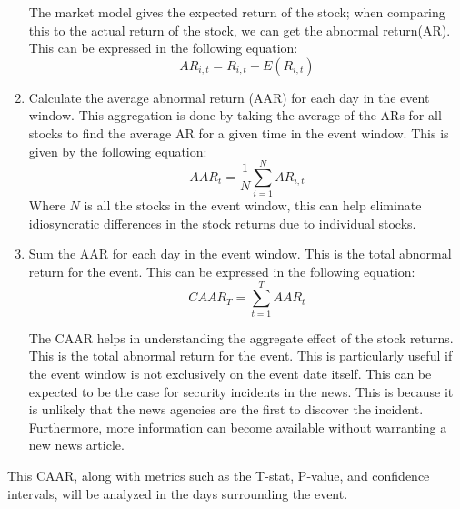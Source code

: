 \begin{enumerate}
    The market model gives the expected return of the stock; when comparing this to the actual return of the stock, we can get the abnormal return(AR). This can be expressed in the following equation:
    $$
A R_{i, t}=R_{i, t}-E\left(R_{i, t}\right)
$$

    \item Calculate the average abnormal return (AAR) for each day in the event window. This aggregation is done by taking the average of the ARs for all stocks to find the average AR for a given time in the event window. This is given by the following equation:
    $$
    A A R_{t}=\frac{1}{N} \sum_{i=1}^{N} A R_{i, t}
    $$
    Where $N$ is all the stocks in the event window, this can help eliminate idiosyncratic differences in the stock returns due to individual stocks.

    \item Sum the AAR for each day in the event window. This is the total abnormal return for the event. This can be expressed in the following equation:
    $$
    C A A R_{T}=\sum_{t=1}^{T} A A R_{t}
    $$

    The CAAR helps in understanding the aggregate effect of the stock returns. This is the total abnormal return for the event. This is particularly useful if the event window is not exclusively on the event date itself. This can be expected to be the case for security incidents in the news. This is because it is unlikely that the news agencies are the first to discover the incident. Furthermore, more information can become available without warranting a new news article.

\end{enumerate}

This CAAR, along with metrics such as the T-stat, P-value, and confidence intervals, will be analyzed in the days surrounding the event.